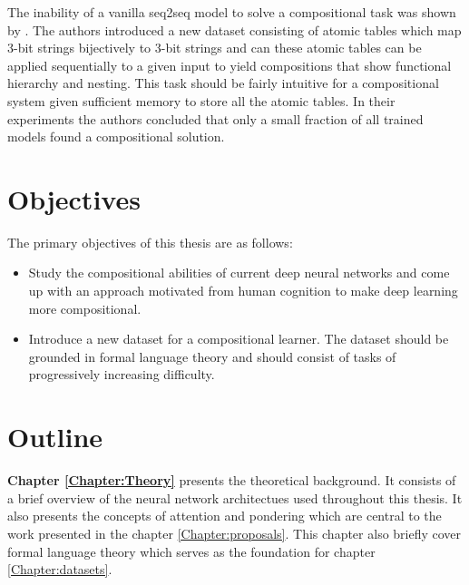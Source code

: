 The inability of a vanilla seq2seq model to solve a compositional task was shown by \cite{Liska2018}. The authors introduced a new dataset consisting of atomic tables which map 3-bit strings bijectively to 3-bit strings and can these atomic tables can be applied sequentially to a given input to yield compositions that show functional hierarchy and nesting. This task should be fairly intuitive for a compositional system given sufficient memory to store all the atomic tables. In their experiments the authors concluded that only a small fraction of all trained models found a compositional solution.


		
\section{Objectives}
	The primary objectives of this thesis are as follows:
	\begin{itemize}
		\item Study the compositional abilities of current deep neural networks and come up with an approach motivated from human cognition to make deep learning more compositional.
		\item Introduce a new dataset for a compositional learner. The dataset should be grounded in formal language theory and should consist of tasks of progressively increasing difficulty.
	\end{itemize}

	
\section{Outline}
	\textbf{Chapter \ref{Chapter:Theory}} presents the theoretical background. It consists of a brief overview of the neural network architectues used throughout this thesis. It also presents the concepts of attention and pondering which are central to the work presented in the chapter \ref{Chapter:proposals}. This chapter also briefly cover formal language theory which serves as the foundation for chapter \ref{Chapter:datasets}.
	
